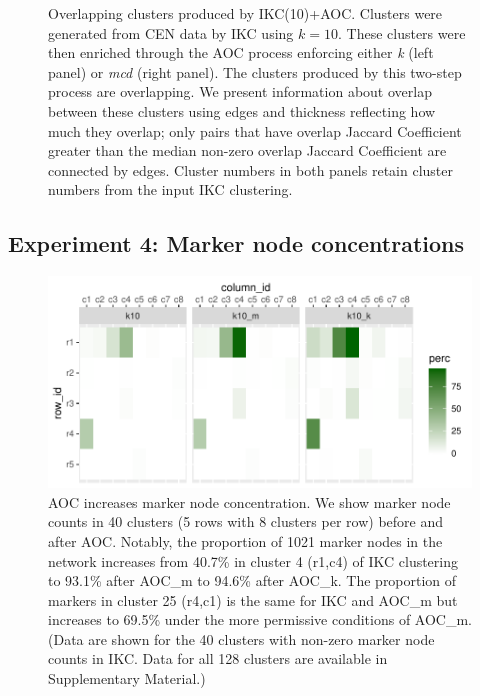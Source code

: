\documentclass[11pt, oneside]{article}   	%
\begin{document}
\begin{figure}[H]
\begin{subfigure}[t]{0.48\textwidth}
    	\end{subfigure}
\caption{Overlapping clusters produced by IKC(10)+AOC.  Clusters were generated from CEN data by IKC using $k=10$. These clusters were then enriched through the AOC process enforcing either \emph{k} (left panel) or \emph{mcd} (right panel). 
The clusters produced  by this two-step process are overlapping. We present information about overlap between these clusters using edges and thickness reflecting how much they overlap; only pairs that have overlap Jaccard Coefficient greater  than the median  non-zero overlap Jaccard Coefficient are connected by edges. 
Cluster numbers in both panels retain cluster numbers from the input IKC clustering.}
\label{fig:fig3}
\end{figure}

\subsection{Experiment 4: Marker node concentrations}

\begin{figure}[H]
	\centering
	 \includegraphics[width=0.7\linewidth]{marker_comps_wide.pdf} 
\caption{AOC increases marker node concentration. We show marker node counts in 40 clusters (5 rows with 8 clusters per row) before and after AOC.  Notably, the proportion of 1021 marker nodes in the network increases from 40.7\% in cluster 4 (r1,c4) of IKC clustering to 93.1\% after AOC\_m to 94.6\% after AOC\_k. The proportion of markers in cluster 25 (r4,c1) is the same for IKC and AOC\_m but increases to  69.5\% under the more permissive conditions of AOC\_m. (Data are shown for the 40 clusters with non-zero marker node counts in IKC. Data for all 128 clusters are available in Supplementary Material.)}
\label{fig:fig4}
\end{figure}
\end{document}
